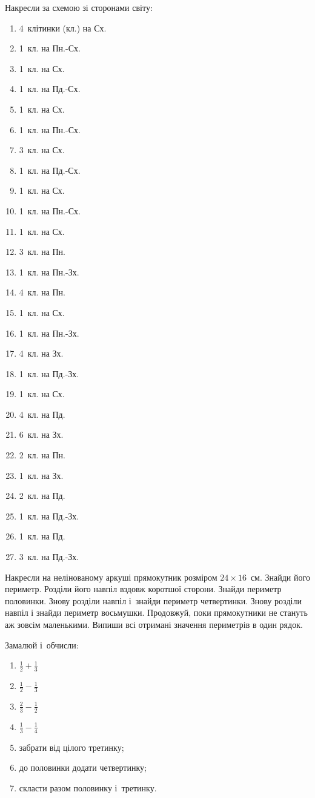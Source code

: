 \problem
Накресли за схемою зі сторонами світу:
\begin{multicols}{2}
  \begin{enumerate}
    \item 4~клітинки (кл.) на Сх.
    \item 1~кл. на Пн.-Сх.
    \item 1~кл. на Сх.
    \item 1~кл. на Пд.-Сх.
    \item 1~кл. на Сх.
    \item 1~кл. на Пн.-Сх.
    \item 3~кл. на Сх.
    \item 1~кл. на Пд.-Сх.
    \item 1~кл. на Сх.
    \item 1~кл. на Пн.-Сх.
    \item 1~кл. на Сх.
    \item 3~кл. на Пн.
    \item 1~кл. на Пн.-Зх.
    \item 4~кл. на Пн.
    \item 1~кл. на Сх.
    \item 1~кл. на Пн.-Зх.
    \item 4~кл. на Зх.
    \item 1~кл. на Пд.-Зх.
    \item 1~кл. на Сх.
    \item 4~кл. на Пд.
    \item 6~кл. на Зх.
    \item 2~кл. на Пн.
    \item 1~кл. на Зх.
    \item 2~кл. на Пд.
    \item 1~кл. на Пд.-Зх.
    \item 1~кл. на Пд.
    \item 3~кл. на Пд.-Зх.
  \end{enumerate}
\end{multicols}


\problem
Накресли на нелінованому аркуші прямокутник розміром $24\times16$~см.
Знайди його периметр.
Розділи його навпіл вздовж коротшої сторони.
Знайди периметр половинки.
Знову розділи навпіл і~знайди периметр четвертинки.
Знову розділи навпіл і знайди периметр восьмушки.
Продовжуй, поки прямокутники не стануть аж зовсім маленькими.
Випиши всі отримані значення периметрів в один рядок.


\problem
Замалюй і~обчисли:
\begin{enumerate}
  \item $\frac{1}{2} + \frac{1}{3}$
  \item $\frac{1}{2} - \frac{1}{3}$
  \item $\frac{2}{3} - \frac{1}{2}$
  \item $\frac{1}{3} - \frac{1}{4}$
  \item забрати від цілого третинку;
  \item до половинки додати четвертинку;
  \item скласти разом половинку і~третинку.
\end{enumerate}



